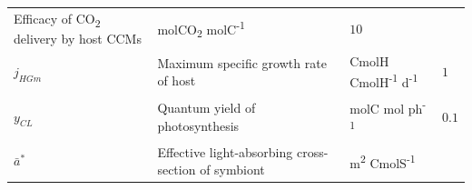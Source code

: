 \documentclass[]{elsarticle} %
\begin{document}
\begin{longtable}[c]{@{}llll@{}}
\begin{minipage}[t]{0.48\columnwidth}\raggedright\strut
Efficacy of CO\textsubscript{2} delivery by host CCMs
\strut\end{minipage} &
\begin{minipage}[t]{0.25\columnwidth}\raggedright\strut
molCO\textsubscript{2} molC\textsuperscript{-1}
\strut\end{minipage} &
\begin{minipage}[t]{0.10\columnwidth}\raggedright\strut
\(10\)
\strut\end{minipage}\tabularnewline
\begin{minipage}[t]{0.10\columnwidth}\raggedright\strut
\(j_{HGm}\)
\strut\end{minipage} &
\begin{minipage}[t]{0.48\columnwidth}\raggedright\strut
Maximum specific growth rate of host
\strut\end{minipage} &
\begin{minipage}[t]{0.25\columnwidth}\raggedright\strut
CmolH CmolH\textsuperscript{-1} d\textsuperscript{-1}
\strut\end{minipage} &
\begin{minipage}[t]{0.10\columnwidth}\raggedright\strut
\(1\)
\strut\end{minipage}\tabularnewline
\begin{minipage}[t]{0.10\columnwidth}\raggedright\strut
\(y_{CL}\)
\strut\end{minipage} &
\begin{minipage}[t]{0.48\columnwidth}\raggedright\strut
Quantum yield of photosynthesis
\strut\end{minipage} &
\begin{minipage}[t]{0.25\columnwidth}\raggedright\strut
molC mol ph\textsuperscript{-1}
\strut\end{minipage} &
\begin{minipage}[t]{0.10\columnwidth}\raggedright\strut
\(0.1\)
\strut\end{minipage}\tabularnewline
\begin{minipage}[t]{0.10\columnwidth}\raggedright\strut
\(\bar{a}^*\)
\strut\end{minipage} &
\begin{minipage}[t]{0.48\columnwidth}\raggedright\strut
Effective light-absorbing cross-section of symbiont
\strut\end{minipage} &
\begin{minipage}[t]{0.25\columnwidth}\raggedright\strut
m\textsuperscript{2} CmolS\textsuperscript{-1}

\end{minipage}
\end{longtable}
\end{document}
